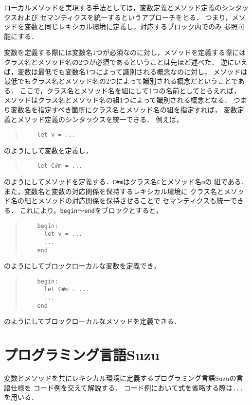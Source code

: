 \documentclass[a4paper,11pt,dvipdfmx]{jreport}
\begin{document}
ローカルメソッドを実現する手法としては，変数定義とメソッド定義のシンタックスおよび
セマンティクスを統一するというアプローチをとる．
つまり，メソッドを変数と同じレキシカル環境に定義し，対応するブロック内でのみ
参照可能にする．

変数を定義する際には変数名1つが必須なのに対し，メソッドを定義する際には
クラス名とメソッド名の2つが必須であるということは先ほど述べた．
逆にいえば，変数は最低でも変数名1つによって識別される概念なのに対し，
メソッドは最低でもクラス名とメソッド名の2つによって識別される概念だということである．
ここで，クラス名とメソッド名を組にして1つの名前としてとらえれば，
メソッドはクラス名とメソッド名の組1つによって識別される概念となる．
つまり変数名を指定すべき箇所にクラス名とメソッド名の組を指定すれば，
変数定義とメソッド定義のシンタックスを統一できる．
例えば，
\begin{quote}
	\begin{verbatim}
	let v = ...
	\end{verbatim}
\end{quote}
のようにして変数を定義し，
\begin{quote}
	\begin{verbatim}
	let C#m = ...
	\end{verbatim}
\end{quote}
のようにしてメソッドを定義する．\verb|C#m|はクラス名\verb|C|とメソッド名\verb|m|の
組である．
また，変数名と変数の対応関係を保持するレキシカル環境に
クラス名とメソッド名の組とメソッドの対応関係を保持させることで
セマンティクスも統一できる．
これにより，\verb|begin|～\verb|end|をブロックとすると，
\begin{quote}
	\begin{verbatim}
	begin:
	  let v = ...
	  ...
	end
	\end{verbatim}
\end{quote}
のようにしてブロックローカルな変数を定義でき，
\begin{quote}
	\begin{verbatim}
	begin:
	  let C#m = ...
	  ...
	end
	\end{verbatim}
\end{quote}
のようにしてブロックローカルなメソッドを定義できる．


\chapter{プログラミング言語Suzu}
\label{chapter:implementation}

変数とメソッドを共にレキシカル環境に定義するプログラミング言語Suzuの言語仕様を
コード例を交えて解説する．
コード例において式を省略する際は\verb|...|を用いる．
\end{document}

